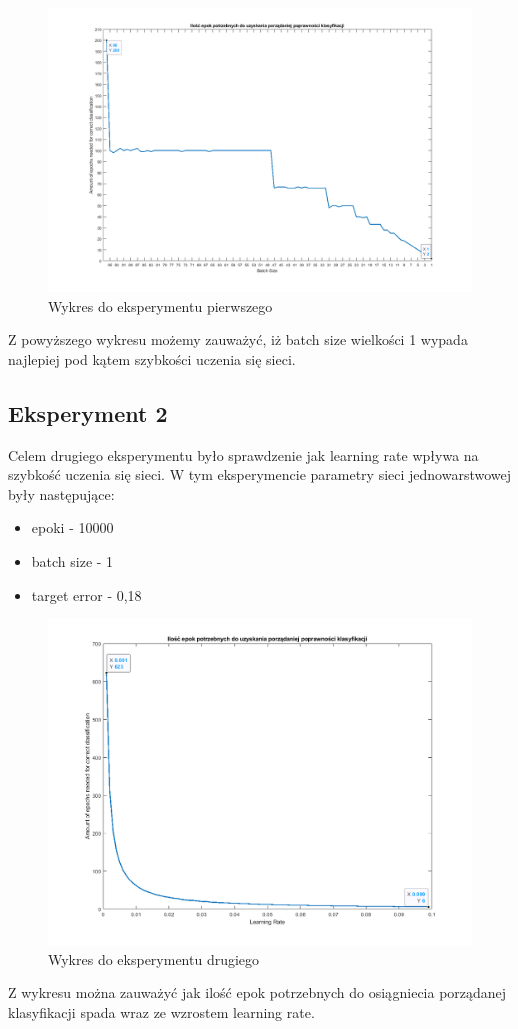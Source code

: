 \documentclass[12pt,twoside]{article}
\begin{document}
\begin{figure}[ht!]
	\centering
	\includegraphics[width=15cm]{figures/batch_epo.png}
	\caption{Wykres do eksperymentu pierwszego}
\end{figure}
Z powyższego wykresu możemy zauważyć, iż batch size wielkości 1 wypada najlepiej pod kątem szybkości uczenia się sieci.
\newpage



\subsection{Eksperyment 2}
Celem drugiego eksperymentu było sprawdzenie jak learning rate wpływa na szybkość uczenia się sieci.
W tym eksperymencie parametry sieci jednowarstwowej były następujące:
\begin{itemize}
	\item epoki - 10000
	\item batch size - 1
	\item target error - 0,18
\end{itemize}

\begin{figure}[ht!]
	\centering
	\includegraphics[width=15cm]{figures/eta_epo.png}
	\caption{Wykres do eksperymentu drugiego}
\end{figure}
Z wykresu można zauważyć jak ilość epok potrzebnych do osiągniecia porządanej klasyfikacji spada wraz ze wzrostem learning rate.
\newpage
\end{document}
